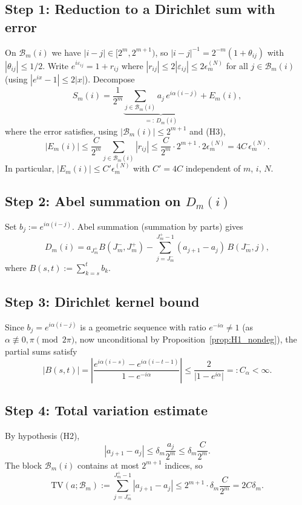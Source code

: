 \documentclass[12pt]{amsart}
\theoremstyle{definition}
\theoremstyle{remark}
\newcommand{\abs}[1]{\lvert#1\rvert}
\begin{document}
\subsection*{Step 1: Reduction to a Dirichlet sum with error}

On $\mathcal{B}_m(i)$ we have $|i-j| \in [2^m, 2^{m+1})$,
so $|i-j|^{-1} = 2^{-m}(1 + \theta_{ij})$ with
$|\theta_{ij}| \leq 1/2$.
Write $e^{i\varepsilon_{ij}} = 1 + r_{ij}$ where
$|r_{ij}| \leq 2|\varepsilon_{ij}| \leq 2\epsilon_m^{(N)}$
for all $j \in \mathcal{B}_m(i)$ (using $|e^{ix}-1|\leq 2|x|$).
Decompose
\[
  S_m(i)
  = \frac{1}{2^m}
    \underbrace{\sum_{j \in \mathcal{B}_m(i)}
      a_j\,e^{i\alpha(i-j)}}_{=:\,D_m(i)}
  + E_m(i),
\]
where the error satisfies, using $|\mathcal{B}_m(i)|\leq 2^{m+1}$
and (H3),
\[
  |E_m(i)|
  \leq \frac{C}{2^m}\sum_{j\in\mathcal{B}_m(i)}|r_{ij}|
  \leq \frac{C}{2^m} \cdot 2^{m+1} \cdot 2\epsilon_m^{(N)}
  = 4C\,\epsilon_m^{(N)}.
\]
In particular, $|E_m(i)| \leq C'\epsilon_m^{(N)}$
with $C' = 4C$ independent of $m$, $i$, $N$.

\subsection*{Step 2: Abel summation on $D_m(i)$}

Set $b_j := e^{i\alpha(i-j)}$.
Abel summation (summation by parts) gives
\[
  D_m(i)
  = a_{J_m^+} B(J_m^-, J_m^+)
    - \sum_{j=J_m^-}^{J_m^+-1}
      (a_{j+1} - a_j)\, B(J_m^-, j),
\]
where $B(s,t) := \sum_{k=s}^{t} b_k$.

\subsection*{Step 3: Dirichlet kernel bound}

Since $b_j = e^{i\alpha(i-j)}$ is a geometric sequence
with ratio $e^{-i\alpha} \neq 1$
(as $\alpha \not\equiv 0,\pi\pmod{2\pi}$,
now unconditional by Proposition~\ref{prop:H1_nondeg}),
the partial sums satisfy
\[
  \abs{B(s,t)}
  = \left|\frac{e^{i\alpha(i-s)} - e^{i\alpha(i-t-1)}}
               {1-e^{-i\alpha}}\right|
  \leq \frac{2}{\abs{1-e^{i\alpha}}}
  =: C_\alpha < \infty.
\]

\subsection*{Step 4: Total variation estimate}

By hypothesis (H2),
\[
  |a_{j+1} - a_j| \leq \delta_m \frac{a_j}{2^m}
  \leq \delta_m \frac{C}{2^m}.
\]
The block $\mathcal{B}_m(i)$ contains at most $2^{m+1}$
indices, so
\[
  \mathrm{TV}(a;\mathcal{B}_m)
  := \sum_{j=J_m^-}^{J_m^+-1} |a_{j+1}-a_j|
  \leq 2^{m+1} \cdot \delta_m \frac{C}{2^m}
  = 2C\delta_m.
\]
\end{document}
